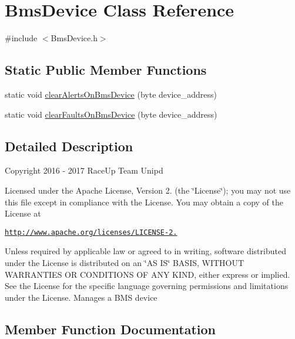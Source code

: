 \hypertarget{class_bms_device}{}\section{Bms\+Device Class Reference}
\label{class_bms_device}


{\ttfamily \#include $<$Bms\+Device.\+h$>$}

\subsection*{Static Public Member Functions}
\begin{DoxyCompactItemize}
\item 
static void \hyperlink{class_bms_device_a020d1204443bd099a6e145505c0b548b}{clear\+Alerts\+On\+Bms\+Device} (byte device\+\_\+address)
\item 
static void \hyperlink{class_bms_device_a6f46ac55f2da38311b9235fcb962fa26}{clear\+Faults\+On\+Bms\+Device} (byte device\+\_\+address)
\end{DoxyCompactItemize}


\subsection{Detailed Description}
Copyright 2016 -\/ 2017 Race\+Up Team Unipd

Licensed under the Apache License, Version 2. (the \char`\"{}\+License\char`\"{}); you may not use this file except in compliance with the License. You may obtain a copy of the License at

\href{http://www.apache.org/licenses/LICENSE-2.0}{\tt http\+://www.\+apache.\+org/licenses/\+L\+I\+C\+E\+N\+S\+E-\/2.}

Unless required by applicable law or agreed to in writing, software distributed under the License is distributed on an \char`\"{}\+A\+S I\+S\char`\"{} B\+A\+S\+IS, W\+I\+T\+H\+O\+UT W\+A\+R\+R\+A\+N\+T\+I\+ES OR C\+O\+N\+D\+I\+T\+I\+O\+NS OF A\+NY K\+I\+ND, either express or implied. See the License for the specific language governing permissions and limitations under the License. Manages a B\+MS device 

\subsection{Member Function Documentation}
